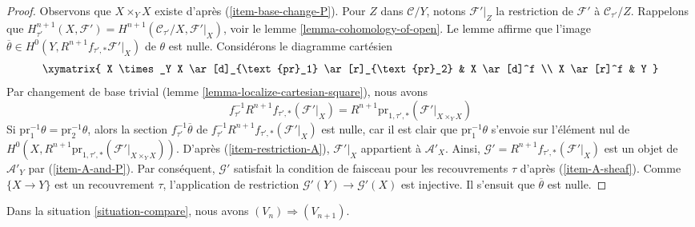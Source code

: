 \begin{proof}
Observons que $X \times_Y X$ existe d'après (\ref{item-base-change-P}).
Pour $Z$ dans $\mathcal{C}/Y$, notons $\mathcal{F}'|_Z$
la restriction de $\mathcal{F}'$ à $\mathcal{C}_{\tau'}/Z$.
Rappelons que $H^{n + 1}_{\tau'}(X, \mathcal{F}') =
H^{n + 1}(\mathcal{C}_{\tau'}/X, \mathcal{F}'|_X)$, voir le
lemme \ref{lemma-cohomology-of-open}.
Le lemme affirme que l'image
$\overline{\theta} \in H^0(Y, R^{n + 1}f_{\tau', *}\mathcal{F}'|_X)$
de $\theta$ est nulle. Considérons le diagramme cartésien
$$
\xymatrix{
X \times_Y X \ar[d]_{\text{pr}_1} \ar[r]_{\text{pr}_2} &
X \ar[d]^f \\
X \ar[r]^f & Y
}
$$
Par changement de base trivial (lemme \ref{lemma-localize-cartesian-square}),
nous avons
$$
f_{\tau'}^{-1}R^{n + 1}f_{\tau', *}(\mathcal{F}'|_X) =
R^{n + 1}\text{pr}_{1, \tau', *}(\mathcal{F}'|_{X \times_Y X})
$$
Si $\text{pr}_1^{-1}\theta = \text{pr}_2^{-1}\theta$,
alors la section $f_{\tau'}^{-1}\overline{\theta}$ de
$f_{\tau'}^{-1}R^{n + 1}f_{\tau', *}(\mathcal{F}'|_X)$ est nulle,
car il est clair que $\text{pr}_1^{-1}\theta$ s'envoie sur l'élément nul de
$H^0(X, R^{n + 1}\text{pr}_{1, \tau', *}(\mathcal{F}'|_{X \times_Y X}))$.
D'après (\ref{item-restriction-A}), $\mathcal{F}'|_X$ appartient à
$\mathcal{A}'_X$. Ainsi,
$\mathcal{G}' = R^{n + 1}f_{\tau', *}(\mathcal{F}'|_X)$
est un objet de $\mathcal{A}'_Y$ par (\ref{item-A-and-P}).
Par conséquent, $\mathcal{G}'$ satisfait la condition de faisceau pour les
recouvrements $\tau$ d'après (\ref{item-A-sheaf}).
Comme $\{X \to Y\}$ est un recouvrement $\tau$, l'application de restriction
$\mathcal{G}'(Y) \to \mathcal{G}'(X)$ est injective.
Il s'ensuit que $\overline{\theta}$ est nulle.
\end{proof}

\begin{lemma}
\label{lemma-induction-step-V-C-general}
Dans la situation \ref{situation-compare}, nous avons
$(V_n) \Rightarrow (V_{n + 1})$.
\end{lemma}

